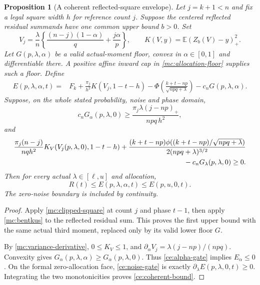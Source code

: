 \documentclass[aop,preprint]{imsart}
\newtheorem{proposition}[theorem]{Proposition}
\theoremstyle{definition}
\newcommand{\E}{\mathbb E}
\numberwithin{equation}{section}
\begin{document}
\begin{proposition}[A coherent reflected-square envelope]\label{ce:coherent}
Let $j=k+1<n$ and fix a legal square width $h$ for reference count $j$.
Suppose the centered reflected residual summands have one common upper
bound $b>0$. Set
\[
 V_j=\frac\lambda n\left\{\frac{(n-j)(1-\alpha)}q+\frac{j\alpha}p\right\},
 \qquad K(V,y)=\E(Z_b(V)-y)_+^2.
\]
Let $G(p,\lambda,\alpha)$ be a valid actual-moment floor, convex in
$\alpha\in[0,1]$ and differentiable there. A positive affine inward
cap in \eqref{mc:allocation-floor} supplies such a floor.
Define
\begin{align}\label{ce:coherent-price}
 E(p,\lambda,\alpha,t)={}&F_k+
     \frac{\pi_j}{h^2}K(V_j,1-t-h)
 -\Phi\left(\frac{k+t-np}{\sqrt{npq+\lambda}}\right)
 -c_nG(p,\lambda,\alpha).
\end{align}
Suppose, on the whole stated probability, noise and phase domain,
\begin{equation}\label{ce:alpha-gate}
 c_nG_\alpha(p,\lambda,0)
 \ge\frac{\pi_j\lambda(j-np)_+}{npq\,h^2},
\end{equation}
and
\begin{align}\label{ce:noise-gate}
 \frac{\pi_j(n-j)}{nq h^2}K_V(V_j(p,\lambda,0),1-t-h)
 +\frac{(k+t-np)\phi((k+t-np)/\sqrt{npq+\lambda})}
                  {2(npq+\lambda)^{3/2}}\notag\\
  {}-c_nG_\lambda(p,\lambda,0)\ge0.
\end{align}
Then for every actual $\lambda\in[\ell,u]$ and allocation,
\begin{equation}\label{ce:coherent-bound}
 R(t)\le E(p,\lambda,\alpha,t)\le E(p,u,0,t).
\end{equation}
The zero-noise boundary is included by continuity.
\end{proposition}
\begin{proof}
Apply \eqref{mc:clipped-square} at count $j$ and phase $t-1$,
then apply \eqref{mc:bentkus} to the reflected residual sum.
This proves the first upper bound with the same actual third moment,
replaced only by its valid lower floor $G$.

By \eqref{mc:variance-derivative}, $0\le K_V\le1$, and
$\partial_\alpha V_j=\lambda(j-np)/(npq)$.
Convexity gives $G_\alpha(p,\lambda,\alpha)\ge G_\alpha(p,\lambda,0)$.
Thus \eqref{ce:alpha-gate} implies $E_\alpha\le0$.
On the formal zero-allocation face, \eqref{ce:noise-gate} is exactly
$\partial_\lambda E(p,\lambda,0,t)\ge0$. Integrating the two
monotonicities proves \eqref{ce:coherent-bound}.
\end{proof}
\end{document}
